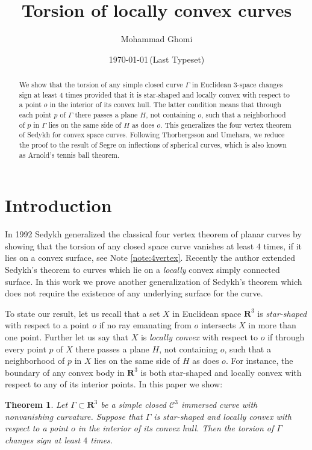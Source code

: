 \documentclass[11pt]{amsart}
\title[]{Torsion of locally convex curves}
\author{Mohammad Ghomi}
\date{\today \,(Last Typeset)}
\newtheorem{thm}{Theorem}[section]
\theoremstyle{definition}
\newcommand{\R}{\mathbf{R}}
\newcommand{\C}{\mathcal{C}}
\renewcommand{\(}{\left(}
\renewcommand{\)}{\right)}
\begin{document}
\begin{abstract}
We show that the torsion of any simple closed curve $\Gamma$ in Euclidean 3-space changes sign at least $4$ times provided that it is star-shaped and locally convex with respect to a point $o$ in the interior of its convex hull. The latter condition means that through each point $p$ of $\Gamma$ there passes a  plane $H$, not containing $o$, such that a neighborhood of $p$ in $\Gamma$ lies on the same side  of $H$ as does $o$. This generalizes the four vertex theorem of Sedykh for convex space curves. Following Thorbergsson and Umehara, we reduce the proof to the result of Segre on inflections of spherical curves, which is also known as Arnold's tennis ball theorem.
\end{abstract}

\maketitle

\section{Introduction}
In 1992 Sedykh \cite{sedykh:originalvertex, sedykh:vertex} generalized the classical four vertex theorem of planar curves by showing that the torsion of any closed space curve  vanishes at least $4$ times, if it lies on a convex surface, see Note \ref{note:4vertex}. Recently the author \cite{ghomi:rosenberg} extended Sedykh's theorem to curves which lie on a \emph{locally} convex simply connected surface. In this work we prove another generalization of Sedykh's theorem which does not require the existence of any underlying surface for the curve. 

To state our result, let us recall that 
a set $X$ in Euclidean space $\R^3$ is \emph{star-shaped} with respect to a point $o$ if no ray emanating from $o$ intersects $X$ in more than one point. Further let us say that $X$ is \emph{locally convex} with respect to $o$ if through  every point $p$ of $X$ there passes a plane $H$, not containing $o$, such that a neighborhood of $p$ in $X$ lies on the same side of $H$ as does $o$. For instance, the boundary of any convex body in $\R^3$ is both star-shaped and locally convex with respect to any of its interior points. In this paper we show:

\begin{thm}\label{thm:main}
Let $\Gamma\subset\R^3$ be a simple closed $\C^3$ immersed curve with nonvanishing curvature. Suppose that $\Gamma$ is star-shaped and locally convex with respect to a point  $o$ in the interior of its convex hull. Then the torsion of $\Gamma$ changes sign at least $4$ times.
\end{thm}
\end{document}
